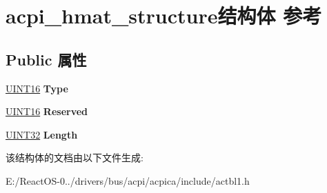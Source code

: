 \hypertarget{structacpi__hmat__structure}{}\section{acpi\+\_\+hmat\+\_\+structure结构体 参考}
\label{structacpi__hmat__structure}
\subsection*{Public 属性}
\begin{DoxyCompactItemize}
\item 
\mbox{\label{structacpi__hmat__structure_a1d22f4c15bea025856d446ae98abbfc2}} 
\hyperlink{_processor_bind_8h_a09f1a1fb2293e33483cc8d44aefb1eb1}{U\+I\+N\+T16} {\bfseries Type}
\item 
\mbox{\label{structacpi__hmat__structure_ab0bb8d4cfad055a8816caa031ce15010}} 
\hyperlink{_processor_bind_8h_a09f1a1fb2293e33483cc8d44aefb1eb1}{U\+I\+N\+T16} {\bfseries Reserved}
\item 
\mbox{\label{structacpi__hmat__structure_a0d9cc8c133ec4507faf5b5a70b21980f}} 
\hyperlink{_processor_bind_8h_ae1e6edbbc26d6fbc71a90190d0266018}{U\+I\+N\+T32} {\bfseries Length}
\end{DoxyCompactItemize}


该结构体的文档由以下文件生成\+:\begin{DoxyCompactItemize}
\item 
E\+:/\+React\+O\+S-\/0../drivers/bus/acpi/acpica/include/actbl1.\+h\end{DoxyCompactItemize}
